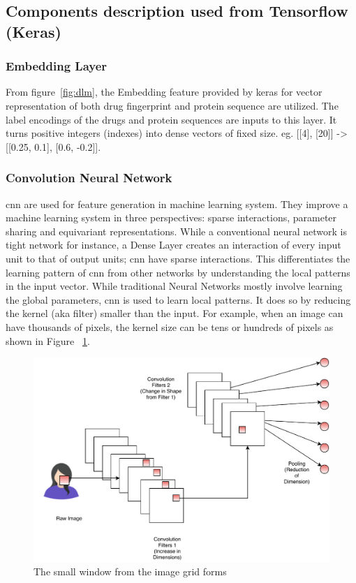   \subsection{Components description used from Tensorflow (Keras)}
  \subsubsection{Embedding Layer}
  From figure~\ref{fig:dlm}, the Embedding feature provided by keras for vector representation of both drug fingerprint and protein sequence are utilized. The label encodings of the drugs and protein sequences are inputs to this layer. It turns positive integers (indexes) into dense vectors of fixed size. eg. [[4], [20]] -> [[0.25, 0.1], [0.6, -0.2]].

  \subsubsection{Convolution Neural Network}
  \acrfull{cnn} are used for feature generation in machine learning system. They improve a machine learning system in three perspectives: sparse interactions, parameter sharing and equivariant representations. While a conventional neural network is tight network for instance, a Dense Layer creates an interaction of every input unit to that of output units; \acrshort{cnn} have sparse interactions. This differentiates the learning pattern of \acrshort{cnn} from other networks by understanding the local patterns in the input vector. While traditional Neural Networks mostly involve learning the global parameters, \acrshort{cnn} is used to learn local patterns. It does so by reducing the kernel (aka filter) smaller than the input. For example, when an image can have thousands of pixels, the kernel size can be tens or hundreds of pixels as shown in Figure ~\ref{fig:cnn}. 
  
  
  \begin{figure}[H]
    \centering
    \includegraphics[width=1\linewidth]{mainmatter/3-Methodology/images/System-Block-CNN-Layer.pdf}
    \caption[Working of CNN Block]{The small window from the image grid forms }
    \label{fig:cnn}
  \end{figure}
  
